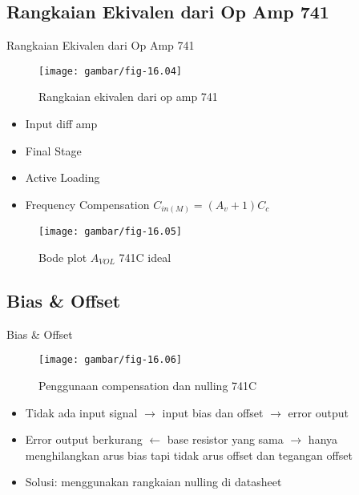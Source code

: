 \subsection{Rangkaian Ekivalen dari Op Amp 741}
\begin{frame}{Rangkaian Ekivalen dari Op Amp 741}
	\begin{multicols}{2}
		\begin{figure}
			\centering
			\texttt{[image: gambar/fig-16.04]}
			\caption{Rangkaian ekivalen dari op amp 741}
			\label{fig-16.04}
		\end{figure}
		\columnbreak
		\begin{itemize}
			\item Input diff amp
			\item Final Stage
			\item Active Loading
			\item Frequency Compensation $ C_{in(M)} = (A_v + 1) C_c $
		\end{itemize}
		\begin{figure}
			\centering
			\texttt{[image: gambar/fig-16.05]}
			\caption{Bode plot $ A_{VOL} $ 741C ideal}
			\label{fig-16.05}
		\end{figure}
	\vfill\null
	\end{multicols}
\end{frame}

\subsection{Bias \& Offset}
\begin{frame}{Bias \& Offset}
	\begin{multicols}{2}
		\begin{figure}
			\centering
			\texttt{[image: gambar/fig-16.06]}
			\caption{Penggunaan compensation dan nulling 741C}
			\label{fig-16.06}
		\end{figure}
		\columnbreak
		\begin{itemize}
			\item Tidak ada input signal $ \rightarrow $ input bias dan offset $ \rightarrow $ error output
			\item Error output berkurang $ \leftarrow $ base resistor yang sama $ \rightarrow $ hanya menghilangkan arus bias tapi tidak arus offset dan tegangan offset
			\item Solusi: menggunakan rangkaian nulling di datasheet
		\end{itemize}
		\vfill\null
	\end{multicols}
\end{frame}

